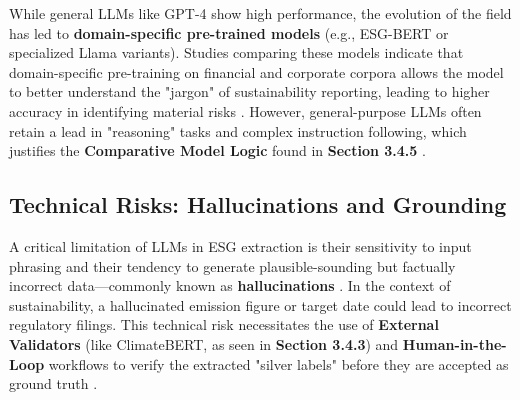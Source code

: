 \documentclass[english, online, cse, master]{dithesis}
\begin{document}
While general LLMs like GPT-4 show high performance, the evolution of the field has led to \textbf{domain-specific pre-trained models} (e.g., ESG-BERT or specialized Llama variants). Studies comparing these models indicate that domain-specific pre-training on financial and corporate corpora allows the model to better understand the "jargon" of sustainability reporting, leading to higher accuracy in identifying material risks  \parencite[]{seyed_alireza_mousavian_anaraki_b56a1c0f, tae_sun_chung_e16a4c18}. However, general-purpose LLMs often retain a lead in "reasoning" tasks and complex instruction following, which justifies the \textbf{Comparative Model Logic} found in \textbf{Section 3.4.5}  \parencite[]{arash_hajikhani_cbb2528f, tae_sun_chung_e16a4c18}.
\subsection{Technical Risks: Hallucinations and Grounding}

A critical limitation of LLMs in ESG extraction is their sensitivity to input phrasing and their tendency to generate plausible-sounding but factually incorrect data—commonly known as \textbf{hallucinations}  \parencite{arash_hajikhani_cbb2528f}. In the context of sustainability, a hallucinated emission figure or target date could lead to incorrect regulatory filings. This technical risk necessitates the use of \textbf{External Validators} (like ClimateBERT, as seen in  \textbf{Section 3.4.3}) and \textbf{Human-in-the-Loop} workflows to verify the extracted "silver labels" before they are accepted as ground truth  \parencite[]{fabian_billert_a5fbb687, marco_bronzini_bf94d949, yinan_yu_e282fd98}.
\end{document}
